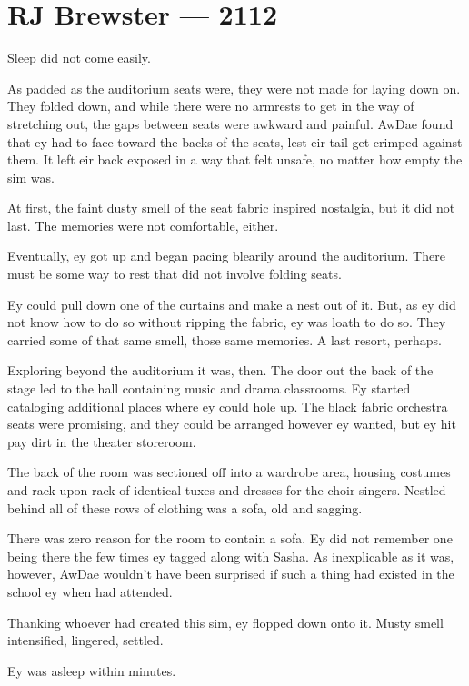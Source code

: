 \hypertarget{rj-brewster-2112}{%
\chapter*{RJ Brewster — 2112}\label{rj-brewster-2112}}

Sleep did not come easily.

As padded as the auditorium seats were, they were not made for laying down on. They folded down, and while there were no armrests to get in the way of stretching out, the gaps between seats were awkward and painful. AwDae found that ey had to face toward the backs of the seats, lest eir tail get crimped against them. It left eir back exposed in a way that felt unsafe, no matter how empty the sim was.

At first, the faint dusty smell of the seat fabric inspired nostalgia, but it did not last. The memories were not comfortable, either.

Eventually, ey got up and began pacing blearily around the auditorium. There must be some way to rest that did not involve folding seats.

Ey could pull down one of the curtains and make a nest out of it. But, as ey did not know how to do so without ripping the fabric, ey was loath to do so. They carried some of that same smell, those same memories. A last resort, perhaps.

Exploring beyond the auditorium it was, then. The door out the back of the stage led to the hall containing music and drama classrooms. Ey started cataloging additional places where ey could hole up. The black fabric orchestra seats were promising, and they could be arranged however ey wanted, but ey hit pay dirt in the theater storeroom.

The back of the room was sectioned off into a wardrobe area, housing costumes and rack upon rack of identical tuxes and dresses for the choir singers. Nestled behind all of these rows of clothing was a sofa, old and sagging.

There was zero reason for the room to contain a sofa. Ey did not remember one being there the few times ey tagged along with Sasha. As inexplicable as it was, however, AwDae wouldn't have been surprised if such a thing had existed in the school ey when had attended.

Thanking whoever had created this sim, ey flopped down onto it. Musty smell intensified, lingered, settled.

Ey was asleep within minutes.

